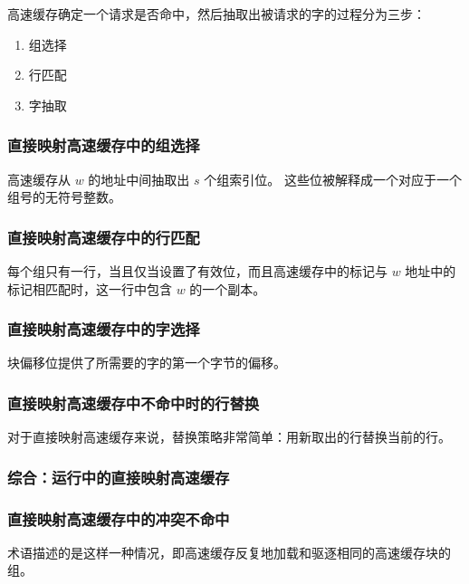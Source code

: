 {{        高速缓存确定一个请求是否命中，然后抽取出被请求的字的过程分为三步：

        \begin{enumerate}
            \item 组选择
            \item 行匹配
            \item 字抽取
        \end{enumerate}

        \subsubsection{直接映射高速缓存中的组选择}
        {
            高速缓存从 $w$ 的地址中间抽取出 $s$ 个组索引位。
            这些位被解释成一个对应于一个组号的无符号整数。
        }

        \subsubsection{直接映射高速缓存中的行匹配}
        {
            每个组只有一行，当且仅当设置了有效位，而且高速缓存中的标记与 $w$ 地址中的标记相匹配时，这一行中包含 $w$ 的一个副本。
        }

        \subsubsection{直接映射高速缓存中的字选择}
        {
            块偏移位提供了所需要的字的第一个字节的偏移。
        }

        \subsubsection{直接映射高速缓存中不命中时的行替换}
        {
            对于直接映射高速缓存来说，替换策略非常简单：用新取出的行替换当前的行。
        }

        \subsubsection{综合：运行中的直接映射高速缓存}
        {

        }

        \subsubsection{直接映射高速缓存中的冲突不命中}
        {
            术语描述的是这样一种情况，即高速缓存反复地加载和驱逐相同的高速缓存块的组。
        }

}}
